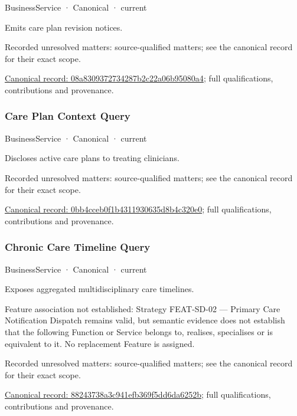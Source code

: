 \label{element:08a8309372734287b2c22a06b95080a4}
{\small BusinessService · Canonical · current}\par

Emits care plan revision notices.


{\small Recorded unresolved matters: source-qualified matters; see the canonical record for their exact scope.}\par
{\footnotesize \href{../../../../continuum/business/business-service/08a8309372734287b2c22a06b95080a4.md}{Canonical record: 08a8309372734287b2c22a06b95080a4}; full qualifications, contributions and provenance.}\par
\subsubsection{Care Plan Context Query}

\label{element:0bb4cceb0f1b4311930635d8b4c320e0}
{\small BusinessService · Canonical · current}\par

Discloses active care plans to treating clinicians.


{\small Recorded unresolved matters: source-qualified matters; see the canonical record for their exact scope.}\par
{\footnotesize \href{../../../../continuum/business/business-service/0bb4cceb0f1b4311930635d8b4c320e0.md}{Canonical record: 0bb4cceb0f1b4311930635d8b4c320e0}; full qualifications, contributions and provenance.}\par
\subsubsection{Chronic Care Timeline Query}

\label{element:88243738a3c941efb369f5dd6da6252b}
{\small BusinessService · Canonical · current}\par

Exposes aggregated multidisciplinary care timelines.



Feature association not established: Strategy FEAT-SD-02 — Primary Care Notification Dispatch remains valid, but semantic evidence does not establish that the following Function or Service belongs to, realises, specialises or is equivalent to it. No replacement Feature is assigned.


{\small Recorded unresolved matters: source-qualified matters; see the canonical record for their exact scope.}\par
{\footnotesize \href{../../../../continuum/business/business-service/88243738a3c941efb369f5dd6da6252b.md}{Canonical record: 88243738a3c941efb369f5dd6da6252b}; full qualifications, contributions and provenance.}\par
